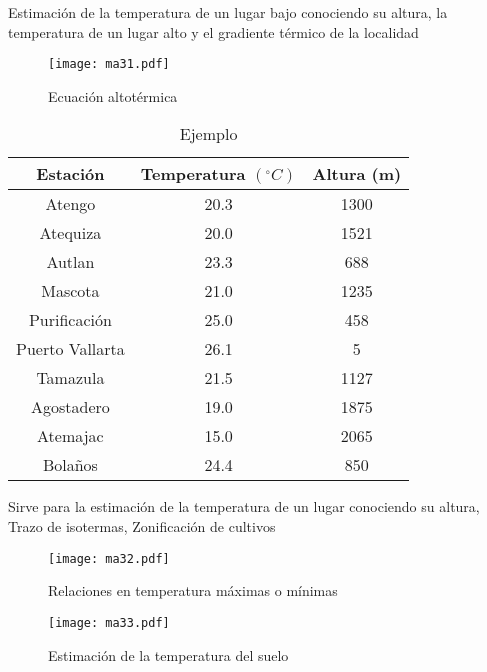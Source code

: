 Estimación de la temperatura de un lugar bajo conociendo su altura, la temperatura de un lugar alto y el gradiente térmico de la localidad
\begin{figure}[h!]
\centering
  \texttt{[image: ma31.pdf]}
  \caption{Ecuación altotérmica}
  \label{ma31}
\end{figure}
\begin{example}
    \begin{table}[h!]
        \centering
        \begin{tabular}{@{}ccc@{}}
        \toprule
        Estación        & Temperatura $(^{\circ}C)$ & Altura (m) \\ \midrule
        Atengo          & 20.3                      & 1300       \\
        Atequiza        & 20.0                      & 1521       \\
        Autlan          & 23.3                      & 688        \\
        Mascota         & 21.0                      & 1235       \\
        Purificación    & 25.0                      & 458        \\
        Puerto Vallarta & 26.1                      & 5          \\
        Tamazula        & 21.5                      & 1127       \\
        Agostadero      & 19.0                      & 1875       \\
        Atemajac        & 15.0                      & 2065       \\
        Bolaños         & 24.4                      & 850        \\ \bottomrule
        \end{tabular}
        \caption{Ejemplo}
        \label{tabma22}
    \end{table}
\end{example}
Sirve para la estimación de la temperatura de un lugar conociendo su altura, Trazo de isotermas, Zonificación de cultivos
\begin{figure}[h!]
\centering
  \texttt{[image: ma32.pdf]}
  \caption{Relaciones en temperatura máximas o mínimas}
  \label{ma32}
\end{figure}
\begin{figure}[h!]
\centering
  \texttt{[image: ma33.pdf]}
  \caption{Estimación de la temperatura del suelo}
  \label{ma33}
\end{figure}
